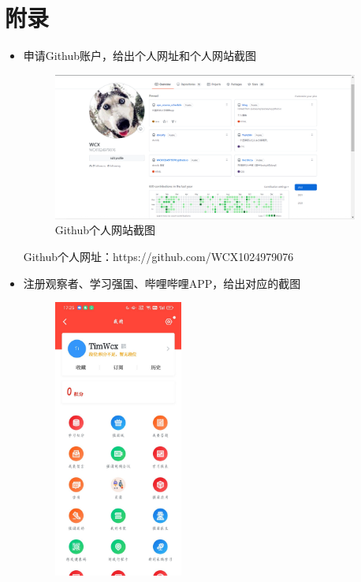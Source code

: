 \documentclass{article}
\begin{document}
\section{附录}
\begin{itemize}
    \item 申请Github账户，给出个人网址和个人网站截图
        \begin{figure}[H]
        \centering
        \includegraphics[width=0.95\textwidth]{github}
        \caption{Github个人网站截图}
        \label{fig:github}
        \end{figure}
        \par
        Github个人网址：https://github.com/WCX1024979076
    \item 注册观察者、学习强国、哔哩哔哩APP，给出对应的截图
        \begin{figure}[H]
        \centering
        \includegraphics[width=0.4\textwidth]{xxqg.jpg}

\end{figure}
\end{itemize}
\end{document}
